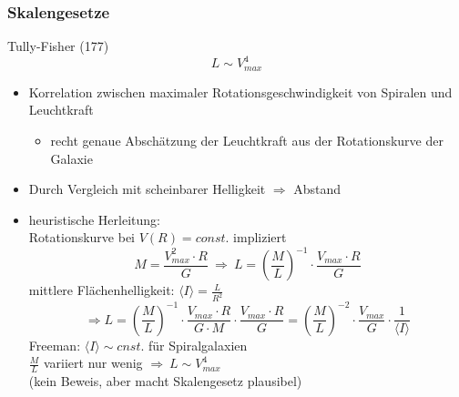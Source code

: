 \subsubsection{Skalengesetze}
Tully-Fisher (177)
\begin{equation*}
	L\sim V^4_{max}
\end{equation*}
\begin{itemize}[label={$\cdot$}]
	\item Korrelation zwischen maximaler Rotationsgeschwindigkeit von Spiralen und Leuchtkraft
		\begin{itemize}
			\item recht genaue Abschätzung der Leuchtkraft aus der Rotationskurve der Galaxie
		\end{itemize}
	\item Durch Vergleich mit scheinbarer Helligkeit $\Rightarrow$ Abstand
	\item heuristische Herleitung:\\
		Rotationskurve bei $V(R)=const. $ impliziert
		\begin{equation*}
			M=\frac{V_{max}^2\cdot R}{G}\ \Rightarrow\ L=\left(\frac{M}{L}\right)^{-1}\cdot\frac{V_{max}\cdot R}{G}
		\end{equation*}
		mittlere Flächenhelligkeit: $\langle I\rangle = \frac{L}{R^2}$
		\begin{equation*}
			\Rightarrow L=\left(\frac{M}{L}\right)^{-1}\cdot\frac{V_{max}\cdot R}{G\cdot M}\cdot\frac{V_{max}\cdot R}{G}=\left(\frac{M}{L}\right)^{-2}\cdot\frac{V_{max}}{G}\cdot\frac{1}{\langle I\rangle}
		\end{equation*}
		Freeman: $\langle I\rangle\sim cnst.$ für Spiralgalaxien\\
		$\frac{M}{L}$ variiert nur wenig $\Rightarrow\ L\sim V_{max}^4$\\
		(kein Beweis, aber macht Skalengesetz plausibel)
\end{itemize}
